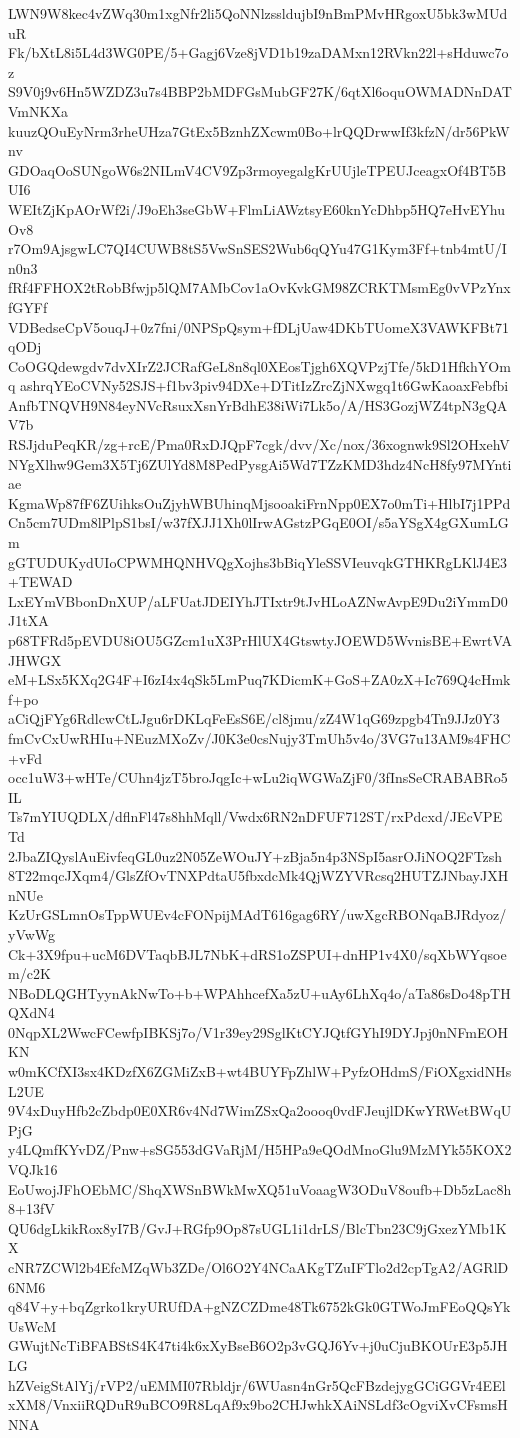 LWN9W8kec4vZWq30m1xgNfr2li5QoNNlzssldujbI9nBmPMvHRgoxU5bk3wMUduR
Fk/bXtL8i5L4d3WG0PE/5+Gagj6Vze8jVD1b19zaDAMxn12RVkn22l+sHduwc7oz
S9V0j9v6Hn5WZDZ3u7s4BBP2bMDFGsMubGF27K/6qtXl6oquOWMADNnDATVmNKXa
kuuzQOuEyNrm3rheUHza7GtEx5BznhZXcwm0Bo+lrQQDrwwIf3kfzN/dr56PkWnv
GDOaqOoSUNgoW6s2NILmV4CV9Zp3rmoyegalgKrUUjleTPEUJceagxOf4BT5BUI6
WEItZjKpAOrWf2i/J9oEh3seGbW+FlmLiAWztsyE60knYcDhbp5HQ7eHvEYhuOv8
r7Om9AjsgwLC7QI4CUWB8tS5VwSnSES2Wub6qQYu47G1Kym3Ff+tnb4mtU/In0n3
fRf4FFHOX2tRobBfwjp5lQM7AMbCov1aOvKvkGM98ZCRKTMsmEg0vVPzYnxfGYFf
VDBedseCpV5ouqJ+0z7fni/0NPSpQsym+fDLjUaw4DKbTUomeX3VAWKFBt71qODj
CoOGQdewgdv7dvXIrZ2JCRafGeL8n8ql0XEosTjgh6XQVPzjTfe/5kD1HfkhYOmq
ashrqYEoCVNy52SJS+f1bv3piv94DXe+DTitIzZrcZjNXwgq1t6GwKaoaxFebfbi
AnfbTNQVH9N84eyNVcRsuxXsnYrBdhE38iWi7Lk5o/A/HS3GozjWZ4tpN3gQAV7b
RSJjduPeqKR/zg+rcE/Pma0RxDJQpF7cgk/dvv/Xc/nox/36xognwk9Sl2OHxehV
NYgXlhw9Gem3X5Tj6ZUlYd8M8PedPysgAi5Wd7TZzKMD3hdz4NcH8fy97MYntiae
KgmaWp87fF6ZUihksOuZjyhWBUhinqMjsooakiFrnNpp0EX7o0mTi+HlbI7j1PPd
Cn5cm7UDm8lPlpS1bsI/w37fXJJ1Xh0lIrwAGstzPGqE0OI/s5aYSgX4gGXumLGm
gGTUDUKydUIoCPWMHQNHVQgXojhs3bBiqYleSSVIeuvqkGTHKRgLKlJ4E3+TEWAD
LxEYmVBbonDnXUP/aLFUatJDEIYhJTIxtr9tJvHLoAZNwAvpE9Du2iYmmD0J1tXA
p68TFRd5pEVDU8iOU5GZcm1uX3PrHlUX4GtswtyJOEWD5WvnisBE+EwrtVAJHWGX
eM+LSx5KXq2G4F+I6zI4x4qSk5LmPuq7KDicmK+GoS+ZA0zX+Ic769Q4cHmkf+po
aCiQjFYg6RdlcwCtLJgu6rDKLqFeEsS6E/cl8jmu/zZ4W1qG69zpgb4Tn9JJz0Y3
fmCvCxUwRHIu+NEuzMXoZv/J0K3e0csNujy3TmUh5v4o/3VG7u13AM9s4FHC+vFd
occ1uW3+wHTe/CUhn4jzT5broJqgIc+wLu2iqWGWaZjF0/3fInsSeCRABABRo5IL
Ts7mYIUQDLX/dflnFl47s8hhMqll/Vwdx6RN2nDFUF712ST/rxPdcxd/JEcVPETd
2JbaZIQyslAuEivfeqGL0uz2N05ZeWOuJY+zBja5n4p3NSpI5asrOJiNOQ2FTzsh
8T22mqcJXqm4/GlsZfOvTNXPdtaU5fbxdcMk4QjWZYVRcsq2HUTZJNbayJXHnNUe
KzUrGSLmnOsTppWUEv4cFONpijMAdT616gag6RY/uwXgcRBONqaBJRdyoz/yVwWg
Ck+3X9fpu+ucM6DVTaqbBJL7NbK+dRS1oZSPUI+dnHP1v4X0/sqXbWYqsoem/c2K
NBoDLQGHTyynAkNwTo+b+WPAhhcefXa5zU+uAy6LhXq4o/aTa86sDo48pTHQXdN4
0NqpXL2WwcFCewfpIBKSj7o/V1r39ey29SglKtCYJQtfGYhI9DYJpj0nNFmEOHKN
w0mKCfXI3sx4KDzfX6ZGMiZxB+wt4BUYFpZhlW+PyfzOHdmS/FiOXgxidNHsL2UE
9V4xDuyHfb2cZbdp0E0XR6v4Nd7WimZSxQa2oooq0vdFJeujlDKwYRWetBWqUPjG
y4LQmfKYvDZ/Pnw+sSG553dGVaRjM/H5HPa9eQOdMnoGlu9MzMYk55KOX2VQJk16
EoUwojJFhOEbMC/ShqXWSnBWkMwXQ51uVoaagW3ODuV8oufb+Db5zLac8h8+13fV
QU6dgLkikRox8yI7B/GvJ+RGfp9Op87sUGL1i1drLS/BlcTbn23C9jGxezYMb1KX
cNR7ZCWl2b4EfcMZqWb3ZDe/Ol6O2Y4NCaAKgTZuIFTlo2d2cpTgA2/AGRlD6NM6
q84V+y+bqZgrko1kryURUfDA+gNZCZDme48Tk6752kGk0GTWoJmFEoQQsYkUsWcM
GWujtNcTiBFABStS4K47ti4k6xXyBseB6O2p3vGQJ6Yv+j0uCjuBKOUrE3p5JHLG
hZVeigStAlYj/rVP2/uEMMI07Rbldjr/6WUasn4nGr5QcFBzdejygGCiGGVr4EEl
xXM8/VnxiiRQDuR9uBCO9R8LqAf9x9bo2CHJwhkXAiNSLdf3cOgviXvCFsmsHNNA
